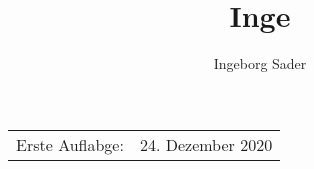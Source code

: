 \documentclass[a5paper,11pt,twoside,onecolumn,openany,extrafontsizes,final]{memoir}%
\title{Inge}
\author{\Huge Ingeborg Sader}
\begin{document}
\pagestyle{empty}

%
\titleM
\vspace{2\baselineskip}
\vspace{\baselineskip}
\begin{center}
\begin {tabular}{lr}
Erste Auflabge: & 24. Dezember 2020\\
\end{tabular}
\end{center}
\vspace{2\baselineskip}
\doclicenseThis
\vspace*{\baselineskip}
\clearpage

\frontmatter
\pagestyle{mystyle}


 
  
    
    
\clearpage
\tableofcontents*


\mainmatter
\sloppybottom

























\backmatter
%
%


\newpage\phantom{blabla}
\pagestyle{empty}
%
\end{document}
